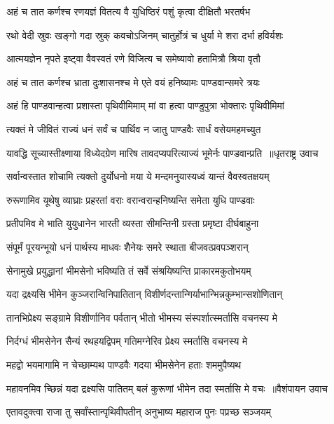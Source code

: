 \twolineshloka
{अहं च तात कर्णश्च रणयज्ञं वितत्य वै}
{युधिष्ठिरं पशुं कृत्वा दीक्षितौ भरतर्षभ}


\twolineshloka
{रथो वेदी स्रुवः खङ्गो गदा स्रुक् कवचोऽजिनम्}
{चातुर्होत्रं च धुर्या मे शरा दर्भा हविर्यशः}


\twolineshloka
{आत्मयज्ञेन नृपते इष्ट्वा वैवस्वतं रणे}
{विजित्य च समेष्यावो हतामित्रौ श्रिया वृतौ}


\twolineshloka
{अहं च तात कर्णश्च भ्राता दुःशासनश्च मे}
{एते वयं हनिष्यामः पाण्डवान्समरे त्रयः}


\twolineshloka
{अहं हि पाण्डवान्हत्वा प्रशास्ता पृथिवीमिमाम्}
{मां वा हत्वा पाण्डुपुत्रा भोक्तारः पृथिवीमिमां}


\twolineshloka
{त्यक्तं मे जीवितं राज्यं धनं सर्वं च पार्थिव}
{न जातु पाण्डवैः सार्धं वसेयमहमच्युत}


\threelineshloka
{यावद्धि सूच्यास्तीक्ष्णाया विध्येदग्रेण मारिष}
{तावदप्यपरित्याज्यं भूमेर्नः पाण्डवान्प्रति ॥धृतराष्ट्र उवाच}
{}


\twolineshloka
{सर्वान्वस्तात शोचामि त्यक्तो दुर्योधनो मया}
{ये मन्दमनुयास्यध्वं यान्तं वैवस्वतक्षयम्}


\twolineshloka
{रुरूणामिव यूथेषु व्याघ्राः प्रहरतां वराः}
{वरान्वरान्हनिष्यन्ति समेता युधि पाण्डवाः}


\twolineshloka
{प्रतीपमिव मे भाति युयुधानेन भारती}
{व्यस्ता सीमन्तिनी ग्रस्ता प्रमृष्टा दीर्घबाहुना}


\twolineshloka
{संपूर्मं पूरयन्भूयो धनं पार्थस्य माधवः}
{शैनेयः समरे स्थाता बीजवत्प्रवपञ्शरान्}


\twolineshloka
{सेनामुखे प्रयुद्धानां भीमसेनो भविष्यति}
{तं सर्वे संश्रयिष्यन्ति प्राकारमकुतोभयम्}


\twolineshloka
{यदा द्रक्ष्यसि भीमेन कुञ्जरान्विनिपातितान्}
{विशीर्णदन्तान्गिर्याभान्भिन्नकुम्भान्सशोणितान्}


\twolineshloka
{तानभिप्रेक्ष्य सङ्ग्रामे विशीर्णानिव पर्वतान्}
{भीतो भीमस्य संस्पर्शात्स्मर्तासि वचनस्य मे}


\twolineshloka
{निर्दग्धं भीमसेनेन सैन्यं रथहयद्विपम्}
{गतिमग्नेरिव प्रेक्ष्य स्मर्तासि वचनस्य मे}


\twolineshloka
{महद्वो भयमागामि न चेच्छाम्यथ पाण्डवैः}
{गदया भीमसेनेन हताः शममुपैष्यथ}


\threelineshloka
{महावनमिव च्छिन्नं यदा द्रक्ष्यसि पातितम्}
{बलं कुरूणां भीमेन तदा स्मर्तासि मे वचः ॥वैशंपायन उवाच}
{}


\twolineshloka
{एतावदुक्त्वा राजा तु सर्वांस्तान्पृथिवीपतीन्}
{अनुभाष्य महाराज पुनः पप्रच्छ सञ्जयम्}


